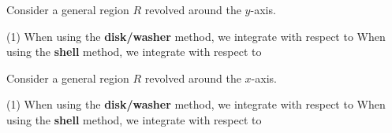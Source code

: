 \documentclass[../mathNotesPreamble]{subfiles}
\begin{document}
  \begin{ex*}
    Consider a general region $R$ revolved around the $y$-axis.
  \end{ex*}
  \begin{tasks}[after-item-skip=\stretch{1}, label=](1)
    \task 
      When using the \textbf{disk/washer} method, we integrate with respect to \underline{\hspace*{25mm}}
    \task 
      When using the \textbf{shell} method, we integrate with respect to \underline{\hspace*{25mm}}
  \end{tasks}
  \begin{ex*}
    Consider a general region $R$ revolved around the $x$-axis.
  \end{ex*}
  \begin{tasks}[after-item-skip=\stretch{1}, label=](1)
    \task 
      When using the \textbf{disk/washer} method, we integrate with respect to \underline{\hspace*{25mm}}
    \task 
      When using the \textbf{shell} method, we integrate with respect to \underline{\hspace*{25mm}}
  \end{tasks}
  \pagebreak
\end{document}
